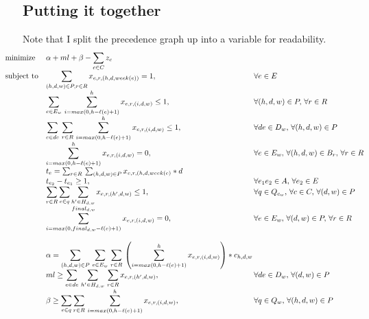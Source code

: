 \documentclass{article}
\begin{document}
    \subsection{Putting it together}
    Note that I split the precedence graph up into a variable for readability.
    \begin{equation*}
        \hspace{-1cm}
        \begin{array}{ll@{}ll}
            \text{minimize}  & \displaystyle\alpha + ml + \beta - \sum_{c \in C} z_c &\\
            \text{subject to}& \displaystyle\sum_{(h,d,w) \in P, r \in R} x_{e,r,(h,d,week(e))} = 1,  & \, \forall e \in E\\
            & \displaystyle\sum_{e \in E_w} \, \sum^h_{i=max(0, h - \ell(e) + 1)} x_{e,r,(i,d,w)} \leq 1, & \, \forall (h,d,w) \in P, \, \forall r \in R\\
            & \displaystyle\sum_{e \in de} \, \sum_{r \in R} \, \sum^h_{i=max(0, h - \ell(e) + 1)} x_{e,r,(i,d,w)} \leq 1 , & \, \forall de \in D_w, \, \forall (h,d,w) \in P\\
            & \displaystyle\sum^h_{i=max(0, h - \ell(e) + 1)}  x_{e,r,(i,d,w)} = 0 , & \, \forall e \in E_w ,\, \forall (h,d,w) \in B_r ,\, \forall r \in R\\
            & t_e = \sum_{r \in R} \, \sum_{(h,d,w) \in P} x_{e,r,(h,d,week(e)} * d&  \\
            & \displaystyle t_{e_2} - t_{e_1} \geq 1, & \, \forall e_1e_2 \in A, \, \forall e_2 \in E\\
            & \displaystyle \sum_{r \in R} \sum_{e \in q} \sum_{h' \in H_{d,w}} x_{e,r,(h',d,w)} \leq 1, & \, \forall q \in Q_{c_w}, \, \forall c \in C , \, \forall (d,w) \in P\\
            & \displaystyle \sum^{final_{d,w}}_{i=max(0, final_{d,w} - \ell(e) + 1)} x_{e,r,(i,d,w)} = 0, & \, \forall e \in E_w , \, \forall (d,w) \in P , \, \forall r \in R\\
            & &\\
            & \displaystyle \alpha = \sum_{(h,d,w) \in P} \, \sum_{e \in E_w} \, \sum_{r \in R} \, \left( \sum^h_{i=max(0, h - \ell(e) + 1)} x_{e,r,(i,d,w)} \right) * c_{h,d,w}\\
            & \displaystyle ml \geq \sum_{e \in de} \, \sum_{h' \in H_{d,w}} \, \sum_{r \in R} x_{e,r,(h',d,w)}, & \, \forall de \in D_w, \, \forall (d,w) \in P\\
            & \displaystyle \beta \geq \sum_{e \in q} \sum_{r \in R} \, \sum^h_{i=max(0, h - \ell(e) + 1)} x_{e,r,(i,d,w)}, & \, \forall q \in Q_w , \, \forall (h,d,w) \in P\\

\end{array}
\end{equation*}
\end{document}
